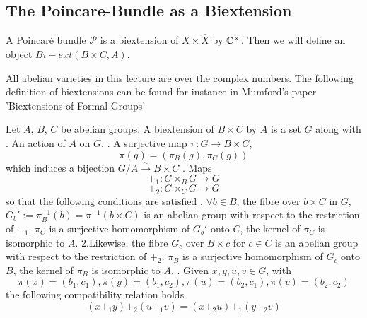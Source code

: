 \subsection{The Poincare-Bundle as a Biextension}
A Poincar\'{e} bundle $\mathcal{P}$ is a biextension of $X\times \hat{X}$ by ${\mathbb C}^\times$. Then we will define an object $Bi-ext(B\times C,A)$. 



\begin{paragraph}
{}All abelian varieties in this lecture are over the complex numbers. The following definition of biextensions can be found for instance in Mumford's paper 'Biextensions of Formal Groups' \begin{definition} Let $A$, $B$, $C$ be abelian groups. A biextension of $B\times C$ by $A$ is a set $G$ along with 
. An action of $A$ on $G$.
. A surjective map $ \pi: G\rightarrow B\times C$, \begin{equation*} \pi(g)=(\pi_B(g), \pi_C(g)) \end{equation*} which induces a bijection $G/A\xrightarrow{\sim} B\times C$
. Maps \begin{equation*}
+_1: G\times_B G\rightarrow G
\end{equation*}
\begin{equation*}
+_2: G\times_C G\rightarrow G
\end{equation*}
so that the following conditions are satisfied
. $\forall b\in B$, the fibre over $b\times C$ in $G$, $G_b':=\pi_B^{-1}(b)=\pi^{-1}(b\times C)$ is an abelian group with respect to the restriction of $+_1$. $\pi_C$ is a surjective homomorphism of $G_b'$ onto $C$, the kernel of $\pi_C$ is isomorphic to $A$. 
\newline 
2.Likewise, the fibre $G_c$ over $B\times c$ for $c\in C$ is an abelian group with respect to the restriction of $+_2$. $\pi_B$ is a surjective homomorphism of $G_c$ onto $B$, the kernel of $\pi_B$ is isomorphic to $A$.
. Given $x,y,u,v\in G$, with
\begin{equation*}
\pi(x)=(b_1,c_1), \pi(y)=(b_1,c_2), \pi(u)=(b_2,c_1), \pi(v)=(b_2,c_2)
\end{equation*}
the following compatibility relation holds
\begin{equation*}
(x +_1 y)+_2 (u +_1 v)=(x +_2 u) +_1 (y+_2 v)

\end{equation*}
\end{definition}
\end{paragraph}
